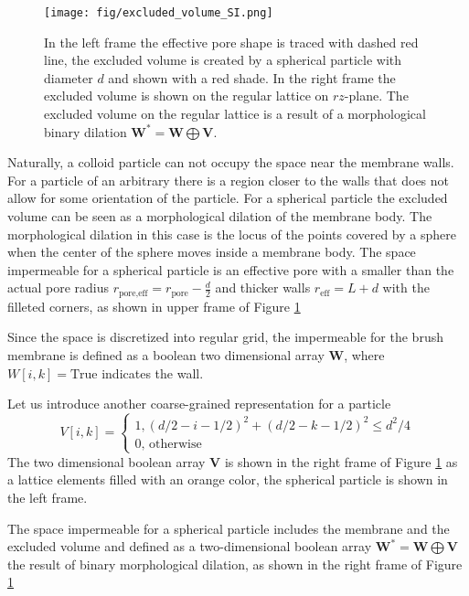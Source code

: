 \documentclass[10pt, a4paper]{article}
\begin{document}
\begin{multicols}{2}

\begin{figure}[H]
    \centering
    \texttt{[image: fig/excluded\_volume\_SI.png]}
    \caption{
        In the left frame the effective pore shape is traced with dashed red line, the excluded volume is created by a spherical particle with diameter $d$ and shown with a red shade.
        In the right frame the excluded volume is shown on the regular lattice on $rz$-plane.
        The excluded volume on the regular lattice is a result of a morphological binary dilation $\bm{W}^{\ast} = \bm{W} \bigoplus \bm{V}$.
        }
    \label{fig:excluded_volume}
\end{figure}

Naturally, a colloid particle can not occupy the space near the membrane walls. 
For a particle of an arbitrary there is a region closer to the walls that does not allow for some orientation of the particle.
For a spherical particle the excluded volume can be seen as a morphological dilation of the membrane body.
The morphological dilation in this case is the locus of the points covered by a sphere when the center of the sphere moves inside a membrane body.
The space impermeable for a spherical particle is an effective pore with a smaller than the actual pore radius $r_{\textrm{pore,eff}} = r_{\textrm{pore}} - \frac{d}{2}$ and thicker walls $r_{\textrm{eff}} = L+d$ with the filleted corners, as shown in upper frame of Figure \ref{fig:excluded_volume}

Since the space is discretized into regular grid, the impermeable for the brush membrane is defined as a boolean two dimensional array $\bm{W}$, where $W[i,k] = \textrm{True}$ indicates the wall.

Let us introduce another coarse-grained representation for a particle
\begin{equation}
    V[i, k] = 
    \begin{cases}
            \textrm{1}, (d/2-i-1/2)^2 + (d/2-k-1/2)^2 \le d^2/4
            \\
            \textrm{0, otherwise}
        \end{cases}
\end{equation}
The two dimensional boolean array $\bm{V}$ is shown in the right frame of Figure \ref{fig:excluded_volume} as a lattice elements filled with an orange color, the spherical particle is shown in the left frame. 

The space impermeable for a spherical particle includes the membrane and the excluded volume and defined as a two-dimensional boolean array $\bm{W}^{\ast} = \bm{W} \bigoplus \bm{V}$ the result of binary morphological dilation, as shown in the right frame of Figure \ref{fig:excluded_volume}

\end{multicols}
\end{document}
